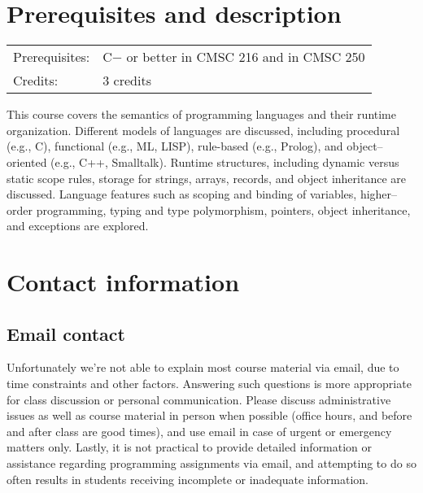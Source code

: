 \documentclass[10pt]{article}
\begin{document}

  \vspace{-5mm}

  \thispagestyle{plain}

  \section{Prerequisites and description}

    \vspace{-1mm}

    \hspace{4mm}\begin{tabular}{ll}

      Prerequisites:
        & C$-$ or better in CMSC 216 and in CMSC 250
        \\

      Credits:
        & 3 credits
        \\

    \end{tabular}

    \smallskip

      This course covers the semantics of programming languages and their
    runtime organization.  Different models of languages are discussed,
    including procedural (e.g., C), functional (e.g., ML, LISP), rule-based
    (e.g., Prolog), and object--oriented (e.g., C++, Smalltalk).  Runtime
    structures, including dynamic versus static scope rules, storage for
    strings, arrays, records, and object inheritance are discussed.
    Language features such as scoping and binding of variables,
    higher--order programming, typing and type polymorphism, pointers,
    object inheritance, and exceptions are explored.

  \section{Contact information}

    \subsection{Email contact\label{section:email}}

      Unfortunately we're not able to explain most course material via email,
    due to time constraints and other factors.  Answering such questions is
    more appropriate for class discussion or personal communication.  Please
    discuss administrative issues as well as course material in person when
    possible (office hours, and before and after class are good times), and
    use email in case of urgent or emergency matters only.  Lastly, it is
    not practical to provide detailed information or assistance regarding
    programming assignments via email, and attempting to do so often results
    in students receiving incomplete or inadequate information.
\end{document}
